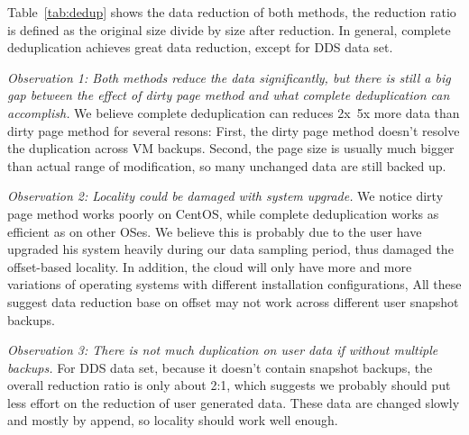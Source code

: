 Table~\ref{tab:dedup} shows the data reduction of both methods, 
the reduction ratio is defined as the original size divide by size after reduction.
In general, complete deduplication achieves great data reduction, except for DDS data set.

\emph{Observation 1: Both methods reduce the data significantly, 
but there is still a big gap between the effect of dirty page method 
and what complete deduplication can accomplish.} 
We believe complete deduplication can reduces 2x~5x more data than dirty page method for several resons:
First, the dirty page method doesn't resolve the duplication across VM backups. Second, the page size
is usually much bigger than actual range of modification, so many unchanged data are still backed up.

\emph{Observation 2: Locality could be damaged with system upgrade.}
We notice dirty page method works poorly on CentOS, while complete deduplication works as efficient as on
other OSes. We believe this is probably due to the user have upgraded his system heavily during our
data sampling period, thus damaged the offset-based locality. In addition, the cloud will only have
more and more variations of operating systems with different installation configurations,
All these suggest data reduction base on offset may not work across different user snapshot backups.

\emph{Observation 3: There is not much duplication on user data if without multiple backups.}
For DDS data set, because it doesn't contain snapshot backups, the overall reduction ratio is only about 2:1,
which suggests we probably should put less effort on the reduction of user generated data. These data
are changed slowly and mostly by append, so locality should work well enough.


